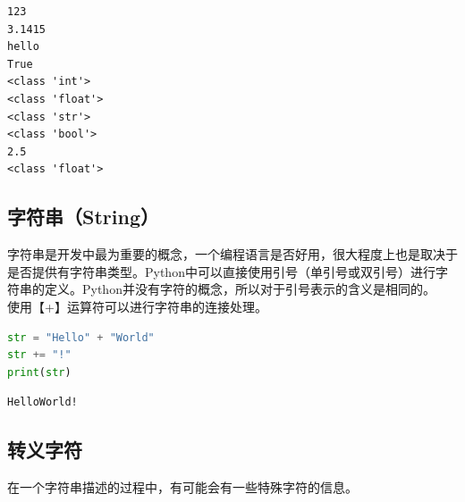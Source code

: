 \begin{tcolorbox}
	\begin{verbatim}
123
3.1415
hello
True
<class 'int'>
<class 'float'>
<class 'str'>
<class 'bool'>
2.5
<class 'float'>
	\end{verbatim}
\end{tcolorbox}

\vspace{0.5cm}

\subsection{字符串（String）}

字符串是开发中最为重要的概念，一个编程语言是否好用，很大程度上也是取决于是否提供有字符串类型。Python中可以直接使用引号（单引号或双引号）进行字符串的定义。Python并没有字符的概念，所以对于引号表示的含义是相同的。\\

使用【+】运算符可以进行字符串的连接处理。\\


\begin{lstlisting}[language=Python]
str = "Hello" + "World"
str += "!"
print(str)
\end{lstlisting}

\begin{tcolorbox}
	\begin{verbatim}
HelloWorld!
	\end{verbatim}
\end{tcolorbox}

\vspace{0.5cm}

\subsection{转义字符}

在一个字符串描述的过程中，有可能会有一些特殊字符的信息。

\begin{table}[H]
	\centering
	\caption{转义字符}
\end{table}

